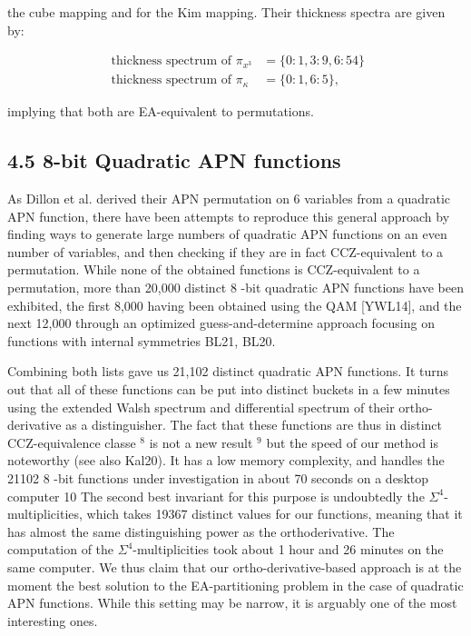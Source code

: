 \documentclass[10pt]{article}
\begin{document}
the cube mapping and for the Kim mapping. Their thickness spectra are given by:

$$
\begin{aligned}
\text { thickness spectrum of } \pi_{x^{3}} & =\{0: 1,3: 9,6: 54\} \\
\text { thickness spectrum of } \pi_{\kappa} & =\{0: 1,6: 5\},
\end{aligned}
$$

implying that both are EA-equivalent to permutations.

\subsection*{4.5 8-bit Quadratic APN functions}
As Dillon et al. derived their APN permutation on 6 variables from a quadratic APN function, there have been attempts to reproduce this general approach by finding ways to generate large numbers of quadratic APN functions on an even number of variables, and then checking if they are in fact CCZ-equivalent to a permutation. While none of the obtained functions is CCZ-equivalent to a permutation, more than 20,000 distinct 8 -bit quadratic APN functions have been exhibited, the first 8,000 having been obtained using the QAM [YWL14], and the next 12,000 through an optimized guess-and-determine approach focusing on functions with internal symmetries BL21, BL20.

Combining both lists gave us 21,102 distinct quadratic APN functions. It turns out that all of these functions can be put into distinct buckets in a few minutes using the extended Walsh spectrum and differential spectrum of their ortho-derivative as a distinguisher. The fact that these functions are thus in distinct CCZ-equivalence classe ${ }^{8}$ is not a new result ${ }^{9}$ but the speed of our method is noteworthy (see also Kal20). It has a low memory complexity, and handles the 21102 8 -bit functions under investigation in about 70 seconds on a desktop computer 10 The second best invariant for this purpose is undoubtedly the $\Sigma^{4}$-multiplicities, which takes 19367 distinct values for our functions, meaning that it has almost the same distinguishing power as the orthoderivative. The computation of the $\Sigma^{4}$-multiplicities took about 1 hour and 26 minutes on the same computer. We thus claim that our ortho-derivative-based approach is at the moment the best solution to the EA-partitioning problem in the case of quadratic APN functions. While this setting may be narrow, it is arguably one of the most interesting ones.
\end{document}
